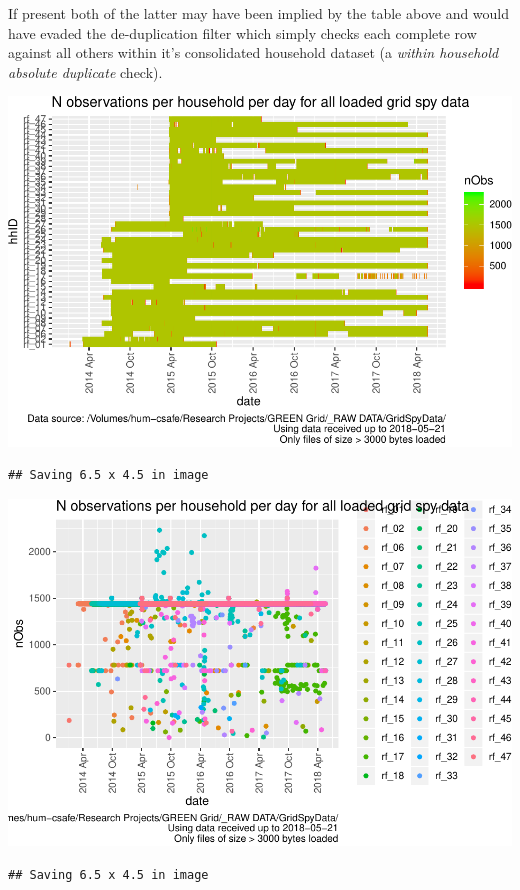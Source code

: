 \documentclass[]{article}
\begin{document}
If present both of the latter may have been implied by the table above
and would have evaded the de-duplication filter which simply checks each
complete row against all others within it's consolidated household
dataset (a \emph{within household absolute duplicate} check).

\includegraphics{processNZGGElecCons1minData_files/figure-latex/loadedFilesObsPlots-1.pdf}

\begin{verbatim}
## Saving 6.5 x 4.5 in image
\end{verbatim}

\includegraphics{processNZGGElecCons1minData_files/figure-latex/loadedFilesObsPlots-2.pdf}

\begin{verbatim}
## Saving 6.5 x 4.5 in image
\end{verbatim}
\end{document}
